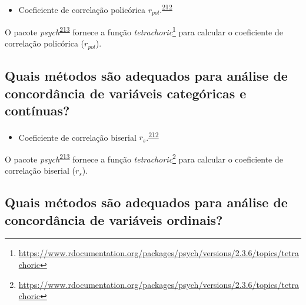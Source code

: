 \documentclass[
  a4paper,
]{book}
\providecommand{\tightlist}{%
  \setlength{\itemsep}{0pt}\setlength{\parskip}{0pt}}
\renewcommand{\href}[2]{#2\footnote{\url{#1}}}
\newenvironment{infobox}[1]
  {
  \begin{itemize}
  \renewcommand{\labelitemi}{
    \raisebox{-.7\height}[0pt][0pt]{
      {\setkeys{Gin}{width=3em,keepaspectratio}
        \texttt{[image: \#1]}}
    }
  }
  \setlength{\fboxsep}{1em}
  \begin{blackbox}
  \item
  }
  {
  \end{blackbox}
  \end{itemize}
  }
\begin{document}
\begin{itemize}
\tightlist
\item
  Coeficiente de correlação policórica \(r_{pol}\).\textsuperscript{\protect\hyperlink{ref-banerjee1999}{212}}
\end{itemize}

\begin{infobox}{images/Rlogo}
O pacote \emph{psych}\textsuperscript{\protect\hyperlink{ref-psych}{213}} fornece a função \href{https://www.rdocumentation.org/packages/psych/versions/2.3.6/topics/tetrachoric}{\emph{tetrachoric}} para calcular o coeficiente de correlação policórica (\(r_{pol}\)).

\end{infobox}

\hypertarget{quais-muxe9todos-suxe3o-adequados-para-anuxe1lise-de-concorduxe2ncia-de-variuxe1veis-categuxf3ricas-e-contuxednuas}{%
\subsection{Quais métodos são adequados para análise de concordância de variáveis categóricas e contínuas?}\label{quais-muxe9todos-suxe3o-adequados-para-anuxe1lise-de-concorduxe2ncia-de-variuxe1veis-categuxf3ricas-e-contuxednuas}}

\begin{itemize}
\tightlist
\item
  Coeficiente de correlação biserial \(r_{s}\).\textsuperscript{\protect\hyperlink{ref-banerjee1999}{212}}
\end{itemize}

\begin{infobox}{images/Rlogo}
O pacote \emph{psych}\textsuperscript{\protect\hyperlink{ref-psych}{213}} fornece a função \href{https://www.rdocumentation.org/packages/psych/versions/2.3.6/topics/tetrachoric}{\emph{tetrachoric}} para calcular o coeficiente de correlação biserial (\(r_{s}\)).

\end{infobox}

\hypertarget{quais-muxe9todos-suxe3o-adequados-para-anuxe1lise-de-concorduxe2ncia-de-variuxe1veis-ordinais}{%
\subsection{Quais métodos são adequados para análise de concordância de variáveis ordinais?}\label{quais-muxe9todos-suxe3o-adequados-para-anuxe1lise-de-concorduxe2ncia-de-variuxe1veis-ordinais}}
\end{document}

